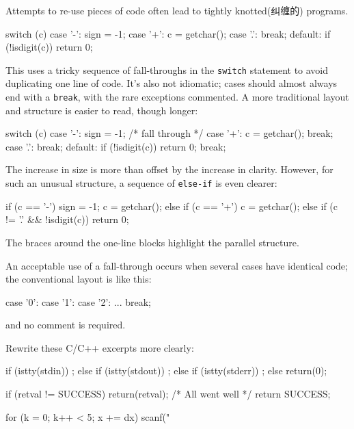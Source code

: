 Attempts to re-use pieces of code often lead to tightly knotted(纠缠的) programs.
\begin{badcode}
    switch (c) {
    case '-': sign = -1;
    case '+': c = getchar();
    case '.': break;
    default: if (!isdigit(c))
                return 0;
    }
\end{badcode}
This uses a tricky sequence of fall-throughs in the \verb'switch' statement
to avoid duplicating one line of code. It's also not idiomatic; cases
should almost always end with a \verb'break', with the rare exceptions
commented. A more traditional layout and structure is easier to read,
though longer:
\begin{badcode}
    switch (c) {
    case '-':
        sign = -1;
        /* fall through */
    case '+':
        c = getchar();
        break;
    case '.':
        break;
    default:
        if (!isdigit(c))
            return 0;
        break;
    }
\end{badcode}
The increase in size is more than offset by the increase in clarity.
However, for such an unusual structure, a sequence of \verb'else-if' is
even clearer:
\begin{wellcode}
    if (c == '-') {
        sign = -1;
        c = getchar();
    } else if (c == '+') {
        c = getchar();
    } else if (c != '.' && !isdigit(c)) {
        return 0;
    }
\end{wellcode}
The braces around the one-line blocks highlight the parallel structure.

An acceptable use of a fall-through occurs when several cases have
identical code; the conventional layout is like this:
\begin{wellcode}
    case '0':
    case '1':
    case '2':
        ...
        break;
\end{wellcode}
and no comment is required.

\begin{exercise}
    Rewrite these C/C++ excerpts more clearly:

    \begin{badcode}
        if (istty(stdin)) ;
        else if (istty(stdout)) ;
            else if (istty(stderr)) ;
                else return(0);
    \end{badcode}

    \begin{badcode}
        if (retval != SUCCESS)
            return(retval);
        /* All went well */
        return SUCCESS;
    \end{badcode}

    \begin{badcode}
        for (k = 0; k++ < 5; x += dx)
            scanf("%
    \end{badcode}
\end{exercise}

